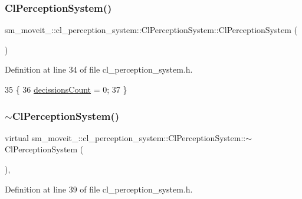 \subsubsection{\texorpdfstring{Cl\+Perception\+System()}{ClPerceptionSystem()}}
{\footnotesize\ttfamily sm\+\_\+moveit\+\_\+::cl\+\_\+perception\+\_\+system\+::\+Cl\+Perception\+System\+::\+Cl\+Perception\+System (\begin{DoxyParamCaption}{ }\end{DoxyParamCaption})\hspace{0.3cm}{\ttfamily [inline]}}



Definition at line 34 of file cl\+\_\+perception\+\_\+system.\+h.


\begin{DoxyCode}
35             \{
36                 \hyperlink{classsm__moveit__4_1_1cl__perception__system_1_1ClPerceptionSystem_ac41f768142251a6a4330c6ca1050b2fe}{decissionsCount} = 0;
37             \}
\end{DoxyCode}
\mbox{\label{classsm__moveit__4_1_1cl__perception__system_1_1ClPerceptionSystem_aa914df8a54f247c92cb0e7c3568b9e44}} 
\subsubsection{\texorpdfstring{$\sim$\+Cl\+Perception\+System()}{~ClPerceptionSystem()}}
{\footnotesize\ttfamily virtual sm\+\_\+moveit\+\_\+::cl\+\_\+perception\+\_\+system\+::\+Cl\+Perception\+System\+::$\sim$\+Cl\+Perception\+System (\begin{DoxyParamCaption}{ }\end{DoxyParamCaption})\hspace{0.3cm}{\ttfamily [inline]}, {\ttfamily [virtual]}}



Definition at line 39 of file cl\+\_\+perception\+\_\+system.\+h.



